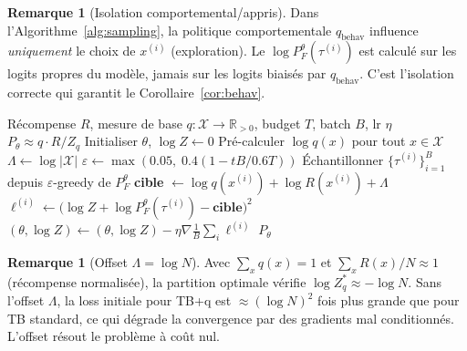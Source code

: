 \documentclass[11pt,a4paper]{article}
\theoremstyle{plain}
\theoremstyle{definition}
\newtheorem{remark}[theorem]{Remarque}
\theoremstyle{remark}
\newcommand{\R}{\mathbb{R}}
\newcommand{\calX}{\mathcal{X}}
\newcommand{\logZ}{\log Z}
\newcommand{\pF}{P_F}
\newcommand{\pth}{P_\theta}
\begin{document}
\begin{remark}[Isolation comportemental/appris]
Dans l'Algorithme~\ref{alg:sampling}, la politique comportementale $q_{\mathrm{behav}}$
influence \emph{uniquement} le choix de $x^{(i)}$ (exploration).
Le $\log\pF^\theta(\tau^{(i)})$ est calculé sur les logits propres du modèle,
jamais sur les logits biaisés par $q_{\mathrm{behav}}$.
C'est l'isolation correcte qui garantit le Corollaire~\ref{cor:behav}.
\end{remark}

\begin{algorithm}[ht]
\caption{TB avec mesure de base — Théorème~\ref{thm:main}}
\label{alg:base}
\begin{algorithmic}[1]
\Require Récompense $R$, mesure de base $q : \calX \to \R_{>0}$,
         budget $T$, batch $B$, lr $\eta$
\Ensure $\pth \approx q \cdot R / Z_q$
\State Initialiser $\theta$, $\logZ \leftarrow 0$
\State Pré-calculer $\log q(x)$ pour tout $x \in \calX$
\State $\Lambda \leftarrow \log|\calX|$
  \State $\varepsilon \leftarrow \max(0.05,\; 0.4(1 - tB/0.6T))$
  \State Échantillonner $\{\tau^{(i)}\}_{i=1}^B$ depuis $\varepsilon$-greedy de $\pF^\theta$
    \State \textbf{cible} $\leftarrow \log q(x^{(i)}) + \log R(x^{(i)}) + \Lambda$
    \State $\ell^{(i)} \leftarrow \bigl(\logZ + \log\pF^\theta(\tau^{(i)}) - \mathbf{cible}\bigr)^2$
  \EndFor
  \State $(\theta, \logZ) \leftarrow (\theta, \logZ) - \eta \nabla \tfrac{1}{B}\sum_i \ell^{(i)}$
\EndFor
\State \Return $\pth$
\end{algorithmic}
\end{algorithm}

\begin{remark}[Offset $\Lambda = \log N$]
\label{rem:offset}
Avec $\sum_x q(x) = 1$ et $\sum_x R(x)/N \approx 1$ (récompense normalisée),
la partition optimale vérifie $\log Z_q^* \approx -\log N$.
Sans l'offset $\Lambda$, la loss initiale pour TB+q est $\approx (\log N)^2$
fois plus grande que pour TB standard, ce qui dégrade la convergence par
des gradients mal conditionnés. L'offset résout le problème à coût nul.
\end{remark}
\end{document}
